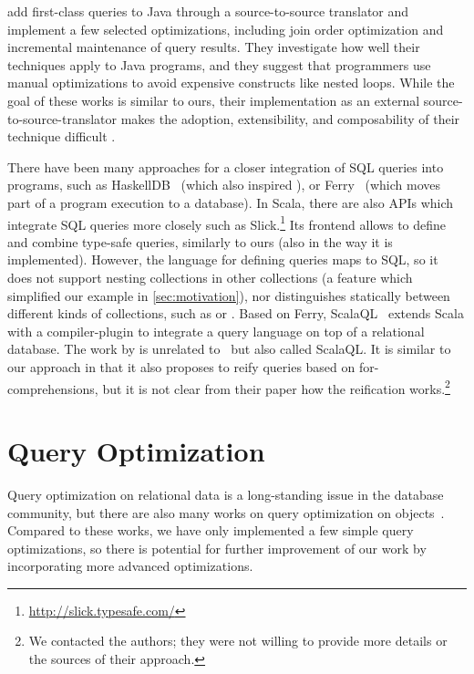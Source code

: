 \citet{Willis06JQL,Willis08} add first-class queries to Java through a source-to-source translator and implement a few selected optimizations, including join order optimization and incremental maintenance of query results.
They investigate how well their techniques apply to Java programs, and they suggest that programmers use manual optimizations to avoid expensive constructs like nested loops. While the goal of these works is similar to ours, their implementation as an external source-to-source-translator makes
the adoption, extensibility, and composability of their technique difficult%
.

There have been many approaches for a closer integration of SQL queries into programs, such as
HaskellDB~\citep{Leijen99DSEC} (which also inspired \LINQ), or Ferry~\citep{Grust:2009:FDP:1559845.1559982} 
(which moves part of a program execution to a database). In Scala, there are also
APIs which integrate SQL queries more closely such as
Slick.\footnote{\url{http://slick.typesafe.com/}} Its frontend allows to define
and combine type-safe queries, similarly to ours (also in the way it is
implemented).
However, the language for defining queries maps to SQL, so it does not support nesting collections
in other collections (a feature which simplified our example in
\cref{sec:motivation}), nor distinguishes statically between different kinds of
collections, such as  or .
Based on Ferry, ScalaQL~\citep{JOT:issue_2010_07/article3} extends Scala with a compiler-plugin to integrate a query language on top of a relational database. The work by \citet{Spiewak09scalaql:language-integrated} is
 unrelated to~\citep{JOT:issue_2010_07/article3} but also called ScalaQL\@. It is similar to our approach in that it also 
proposes to reify queries based on for-comprehensions, but it is not clear from their paper how the reification
works.\footnote{We contacted the authors; they were not willing to provide more details or the sources of their approach.}


\section{Query Optimization}
Query optimization on relational data is a long-standing issue in the database community, but there
are also many works on query optimization on objects~\citep{Fegaras00,Grust99PhD}.
Compared to these works, we have only implemented a few simple query optimizations, so there is potential
for further improvement of our work by incorporating more advanced optimizations.

